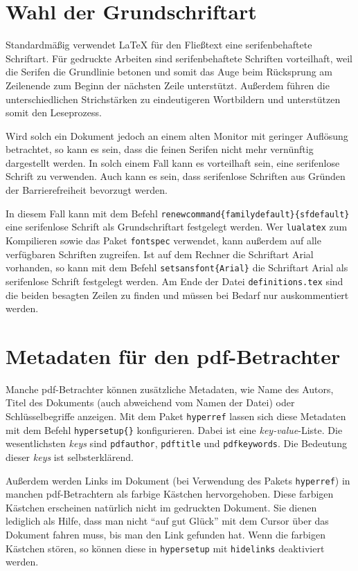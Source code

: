 \section{Wahl der Grundschriftart}
Standardmäßig verwendet \LaTeX{} für den Fließtext eine serifenbehaftete
Schriftart. Für gedruckte Arbeiten sind serifenbehaftete Schriften vorteilhaft,
weil die Serifen die Grundlinie betonen und somit das Auge beim Rücksprung am
Zeilenende zum Beginn der nächsten Zeile unterstützt. Außerdem führen die
unterschiedlichen Strichstärken zu eindeutigeren Wortbildern und unterstützen
somit den Leseprozess.

Wird solch ein Dokument jedoch an einem alten Monitor mit geringer Auflösung 
betrachtet, so kann es sein, dass die feinen Serifen nicht mehr vernünftig 
dargestellt werden. In solch einem Fall kann es vorteilhaft sein, eine
serifenlose Schrift zu verwenden. Auch kann es sein, dass serifenlose Schriften
aus Gründen der Barrierefreiheit bevorzugt werden.

In diesem Fall kann mit dem Befehl
\texttt{\tb renewcommand\{\tb familydefault\}\{\tb sfdefault\}} eine
serifenlose Schrift als Grundschriftart festgelegt werden. Wer 
\texttt{lualatex} zum Kompilieren sowie das Paket \texttt{fontspec} verwendet,
kann außerdem auf alle verfügbaren Schriften zugreifen. Ist auf dem Rechner
die Schriftart Arial vorhanden, so kann mit dem Befehl
\texttt{\tb setsansfont\{Arial\}} die Schriftart Arial als serifenlose
Schrift festgelegt werden. Am Ende der Datei \texttt{definitions.tex} sind
die beiden besagten Zeilen zu finden und müssen bei Bedarf nur auskommentiert
werden.

\section{Metadaten für den pdf-Betrachter}
Manche pdf-Betrachter können zusätzliche Metadaten, wie Name des Autors, Titel 
des Dokuments (auch abweichend vom Namen der Datei) oder Schlüsselbegriffe 
anzeigen. Mit dem Paket \texttt{hyperref} lassen sich diese Metadaten mit
dem Befehl \texttt{\tb hypersetup\{\}} konfigurieren.
Dabei ist  eine \emph{key-value}-Liste. Die wesentlichsten
\emph{keys} sind \texttt{pdfauthor}, \texttt{pdftitle} und
\texttt{pdfkeywords}. Die Bedeutung dieser \emph{keys} ist selbsterklärend.

Außerdem werden Links im Dokument (bei Verwendung des Pakets \texttt{hyperref})
in manchen pdf-Betrachtern als farbige Kästchen hervorgehoben. Diese farbigen
Kästchen erscheinen natürlich nicht im gedruckten Dokument. Sie dienen 
lediglich als Hilfe, dass man nicht \enquote{auf gut Glück} mit dem Cursor
über das Dokument fahren muss, bis man den Link gefunden hat. Wenn die
farbigen Kästchen stören, so können diese in \texttt{\tb hypersetup} mit
\texttt{hidelinks} deaktiviert werden.

